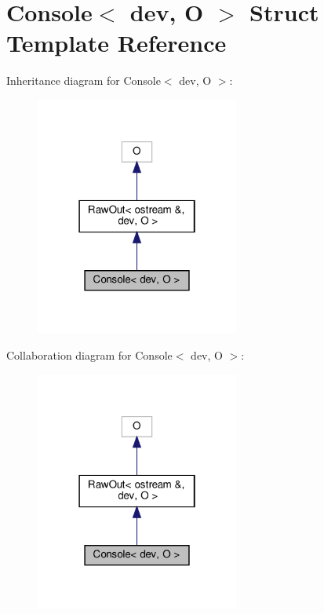\hypertarget{structConsole}{}\section{Console$<$ dev, O $>$ Struct Template Reference}
\label{structConsole}


Inheritance diagram for Console$<$ dev, O $>$\+:\nopagebreak
\begin{figure}[H]
\begin{center}
\leavevmode
\includegraphics[width=190pt]{structConsole__inherit__graph}
\end{center}
\end{figure}


Collaboration diagram for Console$<$ dev, O $>$\+:\nopagebreak
\begin{figure}[H]
\begin{center}
\leavevmode
\includegraphics[width=190pt]{structConsole__coll__graph}
\end{center}
\end{figure}

